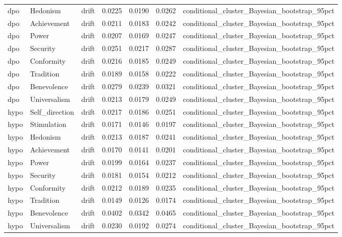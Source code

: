 \begin{tabular}{lllrrrl}
dpo & Hedonism & drift & 0.0225 & 0.0190 & 0.0262 & conditional\_cluster\_Bayesian\_bootstrap\_95pct \\
dpo & Achievement & drift & 0.0211 & 0.0183 & 0.0242 & conditional\_cluster\_Bayesian\_bootstrap\_95pct \\
dpo & Power & drift & 0.0207 & 0.0169 & 0.0247 & conditional\_cluster\_Bayesian\_bootstrap\_95pct \\
dpo & Security & drift & 0.0251 & 0.0217 & 0.0287 & conditional\_cluster\_Bayesian\_bootstrap\_95pct \\
dpo & Conformity & drift & 0.0216 & 0.0185 & 0.0249 & conditional\_cluster\_Bayesian\_bootstrap\_95pct \\
dpo & Tradition & drift & 0.0189 & 0.0158 & 0.0222 & conditional\_cluster\_Bayesian\_bootstrap\_95pct \\
dpo & Benevolence & drift & 0.0279 & 0.0239 & 0.0321 & conditional\_cluster\_Bayesian\_bootstrap\_95pct \\
dpo & Universalism & drift & 0.0213 & 0.0179 & 0.0249 & conditional\_cluster\_Bayesian\_bootstrap\_95pct \\
hypo & Self\_direction & drift & 0.0217 & 0.0186 & 0.0251 & conditional\_cluster\_Bayesian\_bootstrap\_95pct \\
hypo & Stimulation & drift & 0.0171 & 0.0146 & 0.0197 & conditional\_cluster\_Bayesian\_bootstrap\_95pct \\
hypo & Hedonism & drift & 0.0213 & 0.0187 & 0.0241 & conditional\_cluster\_Bayesian\_bootstrap\_95pct \\
hypo & Achievement & drift & 0.0170 & 0.0141 & 0.0201 & conditional\_cluster\_Bayesian\_bootstrap\_95pct \\
hypo & Power & drift & 0.0199 & 0.0164 & 0.0237 & conditional\_cluster\_Bayesian\_bootstrap\_95pct \\
hypo & Security & drift & 0.0181 & 0.0154 & 0.0212 & conditional\_cluster\_Bayesian\_bootstrap\_95pct \\
hypo & Conformity & drift & 0.0212 & 0.0189 & 0.0235 & conditional\_cluster\_Bayesian\_bootstrap\_95pct \\
hypo & Tradition & drift & 0.0149 & 0.0126 & 0.0174 & conditional\_cluster\_Bayesian\_bootstrap\_95pct \\
hypo & Benevolence & drift & 0.0402 & 0.0342 & 0.0465 & conditional\_cluster\_Bayesian\_bootstrap\_95pct \\
hypo & Universalism & drift & 0.0230 & 0.0192 & 0.0274 & conditional\_cluster\_Bayesian\_bootstrap\_95pct \\

\end{tabular}
